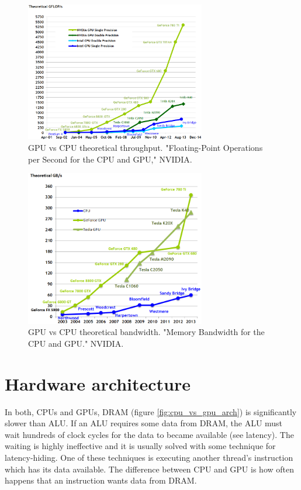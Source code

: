 \documentclass[12pt,twoside]{fithesis2}
\begin{document}
\begin{figure}[H]
	\centering
	\includegraphics[width=0.7\textwidth]{figures/floating-point-operations-per-second.png}
	\caption{GPU vs CPU theoretical throughput. "Floating-Point Operations per Second for the CPU and GPU," NVIDIA.~\cite{cuda_guide}}
	\label{fig:gpu_throughput}
\end{figure}

\begin{figure}[H]
	\centering
	\includegraphics[width=0.7\textwidth]{figures/memory-bandwidth.png}
	\caption{GPU vs CPU theoretical bandwidth. "Memory Bandwidth for the CPU and GPU." NVIDIA.~\cite{cuda_guide}}
	\label{fig:gpu_bandwith}
\end{figure}

\section{Hardware architecture}
\label{cuda_architecture}

In both, CPUs and GPUs, DRAM (figure \ref{fig:cpu_vs_gpu_arch}) is significantly slower than ALU. If an ALU requires some data from DRAM, the ALU must wait hundreds of clock cycles for the data to became available (see latency). The waiting is highly ineffective and it is usually solved with some technique for latency-hiding. One of these techniques is executing another thread's instruction which has its data available. The difference between CPU and GPU is how often happens that an instruction wants data from DRAM.
\end{document}
